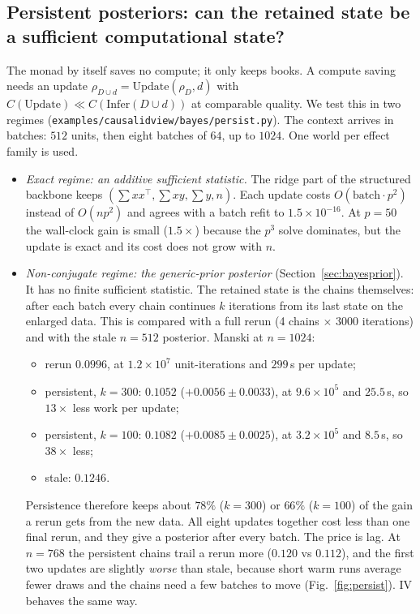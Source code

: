 \documentclass[11pt]{article}
\theoremstyle{definition}
\theoremstyle{remark}
\begin{document}
\subsection{Persistent posteriors: can the retained state be a sufficient computational state?}\label{sec:persist}
The monad by itself saves no compute; it only keeps books. A compute saving needs an update $\rho_{D\cup d}=\mathrm{Update}(\rho_D,d)$ with $C(\mathrm{Update})\ll C(\mathrm{Infer}(D\cup d))$ at comparable quality. We test this in two regimes (\texttt{examples/causalidview/bayes/persist.py}). The context arrives in batches: $512$ units, then eight batches of $64$, up to $1024$. One world per effect family is used.
\begin{itemize}
  \item \emph{Exact regime: an additive sufficient statistic.} The ridge part of the structured backbone keeps $(\sum xx^\top,\sum xy,\sum y,n)$. Each update costs $O(\text{batch}\cdot p^2)$ instead of $O(n p^2)$ and agrees with a batch refit to $1.5\times10^{-16}$. At $p=50$ the wall-clock gain is small ($1.5\times$) because the $p^3$ solve dominates, but the update is exact and its cost does not grow with $n$.
  \item \emph{Non-conjugate regime: the generic-prior posterior} (Section~\ref{sec:bayesprior}). It has no finite sufficient statistic. The retained state is the chains themselves: after each batch every chain continues $k$ iterations from its last state on the enlarged data. This is compared with a full rerun (4 chains $\times$ 3000 iterations) and with the stale $n=512$ posterior. Manski at $n=1024$:
  \begin{itemize}
    \item rerun $0.0996$, at $1.2\times10^{7}$ unit-iterations and $299$\,s per update;
    \item persistent, $k=300$: $0.1052$ ($+0.0056\pm0.0033$), at $9.6\times10^{5}$ and $25.5$\,s, so $13\times$ less work per update;
    \item persistent, $k=100$: $0.1082$ ($+0.0085\pm0.0025$), at $3.2\times10^{5}$ and $8.5$\,s, so $38\times$ less;
    \item stale: $0.1246$.
  \end{itemize}
  Persistence therefore keeps about $78\%$ ($k=300$) or $66\%$ ($k=100$) of the gain a rerun gets from the new data. All eight updates together cost less than one final rerun, and they give a posterior after every batch. The price is lag. At $n=768$ the persistent chains trail a rerun more ($0.120$ vs $0.112$), and the first two updates are slightly \emph{worse} than stale, because short warm runs average fewer draws and the chains need a few batches to move (Fig.~\ref{fig:persist}). IV behaves the same way.
\end{itemize}
\end{document}
